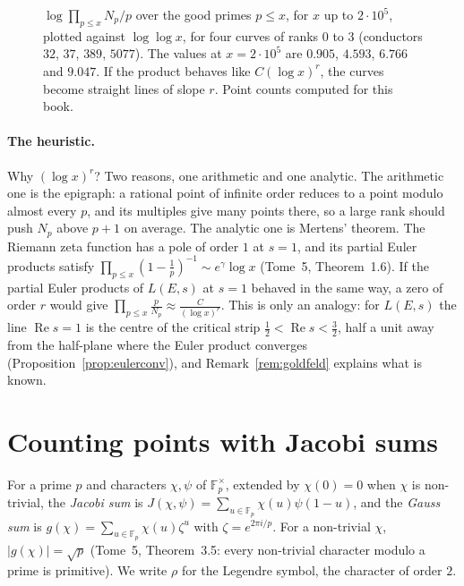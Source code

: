 \begin{figure}[ht]
\centering
{}
\caption{$\log\prod_{p\le x}N_p/p$ over the good primes $p\le x$, for $x$ up to $2\cdot10^5$, plotted against $\log\log x$, for four curves of ranks $0$ to $3$
(conductors $32$, $37$, $389$, $5077$). The values at $x=2\cdot10^5$ are $0.905$, $4.593$, $6.766$ and $9.047$. If the product behaves like $C(\log x)^r$,
the curves become straight lines of slope $r$. Point counts computed for this book.}
\label{fig:bsd}
\end{figure}

\paragraph{The heuristic.} Why $(\log x)^r$? Two reasons, one arithmetic and one analytic. The arithmetic one is the epigraph: a rational point of infinite
order reduces to a point modulo almost every $p$, and its multiples give many points there, so a large rank should push $N_p$ above $p+1$ on average. The
analytic one is Mertens' theorem. The Riemann zeta function has a pole of order $1$ at $s=1$, and its partial Euler products satisfy
$\prod_{p\le x}(1-\frac1p)^{-1}\sim e^\gamma\log x$ (Tome~5, Theorem~1.6). If the partial Euler products of $L(E,s)$ at $s=1$ behaved in the same way, a zero
of order $r$ would give $\prod_{p\le x}\frac p{N_p}\approx\frac C{(\log x)^r}$. This is only an analogy: for $L(E,s)$ the line $\operatorname{Re}s=1$ is the centre of the critical strip
$\frac12<\operatorname{Re}s<\frac32$, half a unit away from the half-plane where the Euler product converges (Proposition~\ref{prop:eulerconv}), and
Remark~\ref{rem:goldfeld} explains what is known.

\section{Counting points with Jacobi sums}

For a prime $p$ and characters $\chi,\psi$ of $\mathbb F_p^\times$, extended by $\chi(0)=0$ when $\chi$ is non-trivial, the \emph{Jacobi sum} is
$J(\chi,\psi)=\sum_{u\in\mathbb F_p}\chi(u)\psi(1-u)$, and the \emph{Gauss sum} is $g(\chi)=\sum_{u\in\mathbb F_p}\chi(u)\zeta^u$ with $\zeta=e^{2\pi i/p}$.
For a non-trivial $\chi$, $|g(\chi)|=\sqrt p$ (Tome~5, Theorem~3.5: every non-trivial character modulo a prime is primitive). We write $\rho$ for the
Legendre symbol, the character of order $2$.

